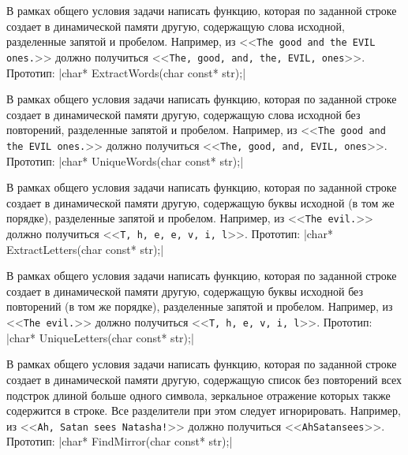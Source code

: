 \zzsectionVARIATIONS


\begin{zztask}
В рамках общего условия задачи написать функцию, которая по заданной строке
создает в динамической памяти другую, содержащую слова исходной,
разделенные запятой и пробелом.
Например, из
<<\texttt{The good and the EVIL ones.}>>
должно получиться
<<\texttt{The, good, and, the, EVIL, ones}>>.
%
Прототип: |char* ExtractWords(char const* str);|
\end{zztask}

\begin{zztask}
В рамках общего условия задачи написать функцию, которая по заданной строке
создает в динамической памяти другую, содержащую слова исходной без
повторений, разделенные запятой и пробелом.
Например, из
<<\texttt{The good and the EVIL ones.}>>
должно получиться
<<\texttt{The, good, and, EVIL, ones}>>.
%
Прототип: |char* UniqueWords(char const* str);|
\end{zztask}

\begin{zztask}
В рамках общего условия задачи написать функцию, которая по заданной строке
создает в динамической памяти другую, содержащую буквы исходной (в том же
порядке), разделенные запятой и пробелом.
Например, из
<<\texttt{The evil.}>>
должно получиться
<<\texttt{T, h, e, e, v, i, l}>>.
%
Прототип: |char* ExtractLetters(char const* str);|
\end{zztask}

\begin{zztask}
В рамках общего условия задачи написать функцию, которая по заданной строке
создает в динамической памяти другую, содержащую буквы исходной без
повторений (в том же порядке), разделенные запятой и пробелом.
Например, из
<<\texttt{The evil.}>>
должно получиться
<<\texttt{T, h, e, v, i, l}>>.
%
Прототип: |char* UniqueLetters(char const* str);|
\end{zztask}

\begin{zztask}
В рамках общего условия задачи написать функцию, которая по заданной строке
создает в динамической памяти другую, содержащую список без повторений всех
подстрок длиной больше одного символа, зеркальное отражение которых также
содержится в строке. Все разделители при этом следует игнорировать.
Например, из
<<\texttt{Ah, Satan sees Natasha!}>>
должно получиться
<<\texttt{AhSatansees}>>.
%
Прототип: |char* FindMirror(char const* str);|
\end{zztask}

